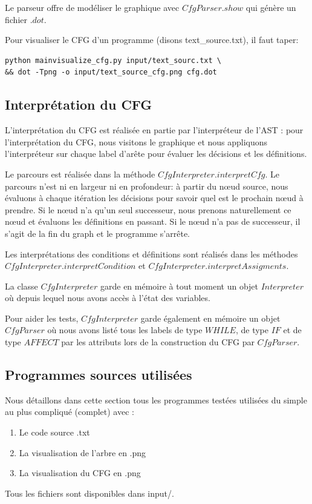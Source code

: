 \documentclass[a4paper]{article}
\begin{document}
Le parseur offre de modéliser le graphique avec $CfgParser.show$ qui génère un fichier $.dot$. 

Pour visualiser le CFG d'un programme (disons text\_source.txt), il faut taper:
\begin{verbatim}
python mainvisualize_cfg.py input/text_sourc.txt \
&& dot -Tpng -o input/text_source_cfg.png cfg.dot
\end{verbatim}

\subsection{Interprétation du CFG}

L'interprétation du CFG est réalisée en partie par l'interpréteur de l'AST : pour l'interprétation du CFG, nous visitons le graphique et nous appliquons l'interpréteur sur chaque label d'arête pour évaluer les décisions et les définitions.

Le parcours est réalisée dans la méthode $CfgInterpreter.interpretCfg$. Le parcours n'est ni en largeur ni en profondeur: à partir du nœud source, nous évaluons à chaque itération les décisions pour savoir quel est le prochain nœud à prendre. Si le nœud n'a qu'un seul successeur, nous prenons naturellement ce nœud et évaluons les définitions en passant. Si le nœud n'a pas de successeur, il s'agit de la fin du graph et le programme s'arrête.

Les interprétations des conditions et définitions sont réalisés dans les méthodes \\
$CfgInterpreter.interpretCondition$ et $CfgInterpreter.interpretAssigments$.

La classe $CfgInterpreter$ garde en mémoire à tout moment un objet $Interpreter$ où depuis lequel nous avons accès à l'état des variables. 

Pour aider les tests, $CfgInterpreter$ garde également en mémoire un objet $CfgParser$ où nous avons listé tous les labels de type $WHILE$, de type $IF$ et de type $AFFECT$ par les attributs lors de la construction du CFG par $CfgParser$.

\subsection{Programmes sources utilisées}

Nous détaillons dans cette section tous les programmes testées utilisées du simple au plus compliqué (complet) avec :
\begin{enumerate}
\item Le code source .txt
\item La visualisation de l'arbre en .png
\item La visualisation du CFG en .png 
\end{enumerate}
Tous les fichiers sont disponibles dans input/.
\end{document}
